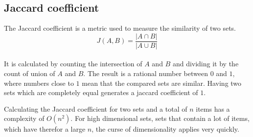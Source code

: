 \subsection{Jaccard coefficient}

The Jaccard coefficient is a metric used to measure the similarity of two sets.\\

\begin{equation}
    J(A,B) = \frac{ | A \cap B | }{ | A \cup B | }
\end{equation}\\

It is calculated by counting the intersection of $ A $ and $ B $ and dividing it by the count of union of $ A $ and $ B $. The result is a rational number between $ 0 $ and $ 1 $, where numbers close to $ 1 $ mean that the compared sets are similar. Having two sets which are completely equal generates a jaccard coefficient of $ 1 $.\\

\begin{figure}[ht]
     
        
\end{figure}


Calculating the Jaccard coefficient for two sets and a total of $ n $ items has a complexity of $ O(n^2) $. For high dimensional sets, sets that contain a lot of items, which have therefor a large $ n $, the curse of dimensionality applies very quickly.\\
